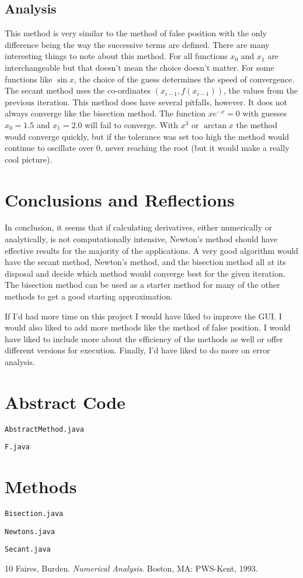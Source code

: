 \documentclass[12pt,oneside]{amsart}
\begin{document}
\subsection{Analysis}
This method is very similar to the method of false position with the only difference being the way the successive terms are defined. There are many interesting things to note about this method. For all functions $x_0$ and $x_1$ are interchangeable but that doesn't mean the choice doesn't matter. For some functions like $\sin{x}$, the choice of the guess determines the speed of convergence. The secant method uses the co-ordinates $(x_{i-1}, f(x_{i-1}))$, the values from the previous iteration. This method does have several pitfalls, however. It does not always converge like the bisection method. The function $xe^{-x}=0$ with guesses $x_0 = 1.5$ and $x_1 = 2.0$ will fail to converge. With $x^3$ or $\arctan{x}$ the method would converge quickly, but if the tolerance was set too high the method would continue to oscillate over 0, never reaching the root (but it would make a really cool picture).

\section{Conclusions and Reflections}
In conclusion, it seems that if calculating derivatives, either numerically or analytically, is not computationally intensive, Newton's method should have effective results for the majority of the applications. A very good algorithm would have the secant method, Newton's method, and the bisection method all at its disposal and decide which method would converge best for the given iteration. The bisection method can be used as a starter method for many of the other methods to get a good starting approximation.

If I'd had more time on this project I would have liked to improve the GUI. I would also liked to add more methods like the method of false position. I would have liked to include more about the efficiency of the methods as well or offer different versions for execution. Finally, I'd have liked to do more on error analysis.
\clearpage
\appendix
\section{Abstract Code}
\texttt{AbstractMethod.java}

\clearpage
\texttt{F.java}

\clearpage

\section{Methods}
\texttt{Bisection.java}

\clearpage
\texttt{Newtons.java}

\clearpage
\texttt{Secant.java}



\begin{thebibliography}
	{10} Faires, Burden. \emph{Numerical Analysis}. Boston, MA: PWS-Kent, 1993.
\end{thebibliography}
\end{document}
